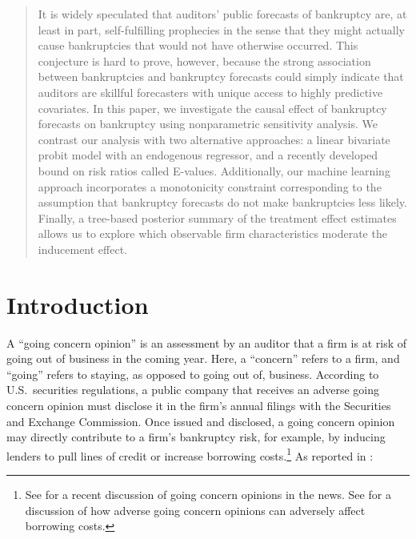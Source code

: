 \documentclass[aoas,preprint, 11pt, dvipsnames, table, x11name]{imsart}
\theoremstyle{remark}
\begin{document}
\begin{frontmatter}
		\begin{abstract}
			It is widely speculated that auditors' public forecasts of bankruptcy are, at least in part, self-fulfilling prophecies in the sense that they might actually cause bankruptcies that would not have otherwise occurred. This conjecture is hard to prove, however, because the strong association between bankruptcies and bankruptcy forecasts could simply indicate that auditors are skillful forecasters with unique access to highly predictive covariates. 
			In this paper, we investigate the causal effect of bankruptcy forecasts on bankruptcy using nonparametric sensitivity analysis. We contrast our analysis with two alternative approaches:  a linear bivariate probit model with an endogenous regressor, and a recently developed bound on risk ratios called E-values. Additionally, our machine learning approach incorporates a monotonicity constraint corresponding to the assumption that bankruptcy forecasts do not make bankruptcies less likely. Finally, a tree-based posterior summary of the treatment effect estimates allows us to explore which observable firm characteristics moderate the inducement effect.
		\end{abstract}
		
		\begin{keyword}
		\end{keyword}
		
	\end{frontmatter}
	\section{Introduction}
	A ``going concern opinion'' is an assessment by an auditor that a firm is at risk of going out of business in the coming year. Here, a ``concern'' refers to a firm, and ``going'' refers to staying, as opposed to going out of, business. According to U.S.~securities regulations, a public company that receives an adverse going concern opinion must disclose it in the firm's annual filings with the Securities and Exchange Commission. Once issued and disclosed, a going concern opinion may directly contribute to a firm's bankruptcy risk, for example, by inducing lenders to pull lines of credit or increase borrowing costs.\footnote{See \cite{maurer-wsj-2020} for a recent discussion of going concern opinions in the news. See \cite{Chen-He-Ma-etal-2016} for a discussion of how adverse going concern opinions can adversely affect borrowing costs.} As reported in \cite{maurer-wsj-2020}:
	
\end{document}
